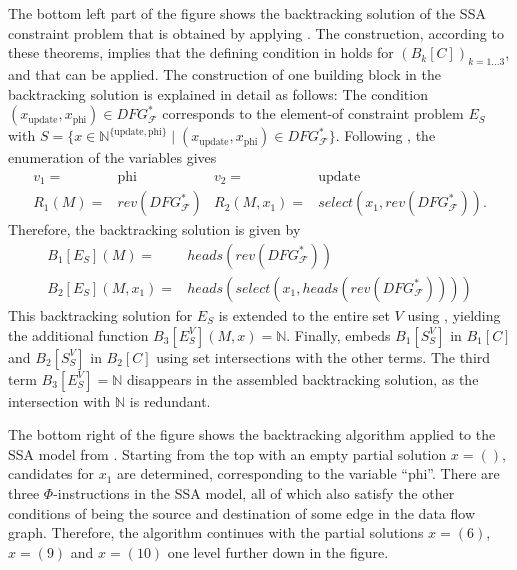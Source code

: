     The bottom left part of the figure shows the backtracking solution
    of the SSA constraint problem that is obtained by applying
    .
    The construction, according to these theorems, implies that the defining
    condition in  holds for $(B_k[C])_{k=1\dots3}$, and
    that  can be applied.
    The construction of one building block in the backtracking solution is
    explained in detail as follows:
    The condition $(x_\text{update},x_\text{phi})\in DFG_\mathcal F^*$
    corresponds to the \mbox{element-of} constraint problem $E_S$ with
    $S=\{x\in\mathbb N^{\{\text{update},\text{phi}\}}\mid (x_\text{update},x_\text{phi})\in DFG_\mathcal F^*\}$.
    Following , the enumeration of the variables gives
    \begin{align*}
    v_1={}&\text{phi}&v_2={}&\text{update}\\
    R_1(M)={}&rev(DFG_\mathcal F^*)&
    R_2(M,x_1)={}&select(x_1,rev(DFG_\mathcal F^*)).
    \end{align*}
    Therefore, the backtracking solution is given by
    \begin{align*}
        B_1[E_S](M)={}&heads(rev(DFG_\mathcal F^*))\\
        B_2[E_S](M,x_1)={}&heads(select(x_1,heads(rev(DFG_\mathcal F^*))))
    \end{align*}
    This backtracking solution for $E_S$ is extended to the entire set $V$ using
    , yielding the additional function
    $B_3[E_S^V](M,x)=\mathbb N$.
    Finally,  embeds $B_1[S_S^V]$ in $B_1[C]$ and
    $B_2[S_S^V]$ in $B_2[C]$ using set intersections with the other terms.
    The third term $B_3[E_S^V]=\mathbb N$ disappears in the assembled
    backtracking solution, as the intersection with $\mathbb N$ is redundant.

    The bottom right of the figure shows the backtracking algorithm applied to
    the SSA model from .
    Starting from the top with an empty partial solution $x=()$, candidates for
    $x_1$ are determined, corresponding to the variable ``phi''.
    There are three $\Phi$-instructions in the SSA model, all of which also
    satisfy the other conditions of being the source and destination of some
    edge in the data flow graph.
    Therefore, the algorithm continues with the partial solutions $x=(6)$,
    $x=(9)$ and $x=(10)$ one level further down in the figure.

